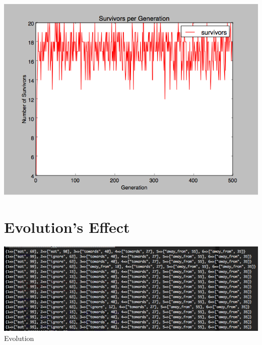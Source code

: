 \documentclass{article}
\begin{document}
\includegraphics[width=1\textwidth]{survivors}




\section{Evolution's Effect}

\includegraphics[width=1.35\textwidth,height=1.35\textheight,keepaspectratio]{traits}
Evolution
\end{document}
